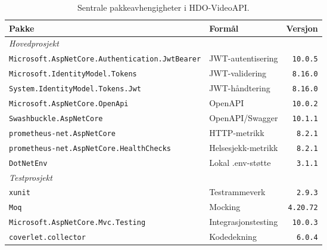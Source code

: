 \begin{table}[H]
\centering
\caption{Sentrale pakkeavhengigheter i HDO-VideoAPI.}
\label{tab:avhengigheter}
\begin{tabular}{llr}
\toprule
\textbf{Pakke} & \textbf{Formål} & \textbf{Versjon} \\
\midrule
\multicolumn{3}{l}{\textit{Hovedprosjekt}} \\
\texttt{Microsoft.AspNetCore.Authentication.JwtBearer} & JWT-autentisering   & \texttt{10.0.5}  \\
\texttt{Microsoft.IdentityModel.Tokens}                & JWT-validering      & \texttt{8.16.0}  \\
\texttt{System.IdentityModel.Tokens.Jwt} & JWT-håndtering   & \texttt{8.16.0}  \\
\texttt{Microsoft.AspNetCore.OpenApi} & OpenAPI   & \texttt{10.0.2}  \\
\texttt{Swashbuckle.AspNetCore}                        & OpenAPI/Swagger     & \texttt{10.1.1}  \\
\texttt{prometheus-net.AspNetCore}                     & HTTP-metrikk        & \texttt{8.2.1}   \\
\texttt{prometheus-net.AspNetCore.HealthChecks}        & Helsesjekk-metrikk  & \texttt{8.2.1}   \\
\texttt{DotNetEnv}                                     & Lokal .env-støtte   & \texttt{3.1.1}   \\
\midrule
\multicolumn{3}{l}{\textit{Testprosjekt}} \\
\texttt{xunit}                                         & Testrammeverk       & \texttt{2.9.3}   \\
\texttt{Moq}                                           & Mocking             & \texttt{4.20.72} \\
\texttt{Microsoft.AspNetCore.Mvc.Testing}              & Integrasjonstesting & \texttt{10.0.3}  \\
\texttt{coverlet.collector}                            & Kodedekning         & \texttt{6.0.4}   \\
\bottomrule
\end{tabular}
\end{table}